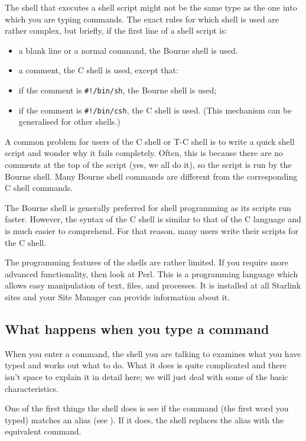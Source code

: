 The shell that executes a shell script might not be the same type as the one
into which you are typing commands.
The exact rules for which shell is used are rather complex, but briefly, if the
first line of a shell script is:
\begin{itemize}
\item a blank line or a normal command, the Bourne shell is used.
\item a comment, the C shell is used, except that:
\item if the comment is {\tt \#!/bin/sh}, the Bourne shell is used;
\item if the comment is {\tt \#!/bin/csh}, the C shell is used.\newline
(This mechanism can be generalised for other shells.)
\end{itemize}
A common problem for users of the C shell or T-C shell is to write a quick
shell script and wonder why it fails completely.
Often, this is because there are no comments at the top of the script (yes,
we all do it), so the script is run by the Bourne shell.
Many Bourne shell commands are different from the corresponding C shell
commands.

The Bourne shell is generally preferred for shell programming as 
its scripts run faster. However, the syntax of the C shell
is similar to that of the C language and is much easier to comprehend.
For that reason, many users write their scripts for the C shell.

The programming features of the shells are rather limited. If you require
more advanced functionality, then look at Perl. This is a programming
language which allows easy manipulation of text, files, and processes.
It is installed at all Starlink sites and your Site Manager can provide
information about it.

\subsection{What happens when you type a command}

When you enter a command, the shell you are talking to examines what you have
typed and works out what to do.
What it does is quite complicated and there isn't space to explain it in detail
here; we will just deal with some of the basic characteristics.

One of the first things the shell does is see if the command (the first word
you typed) matches an alias (see ).
If it does, the shell replaces the alias with the equivalent command.

